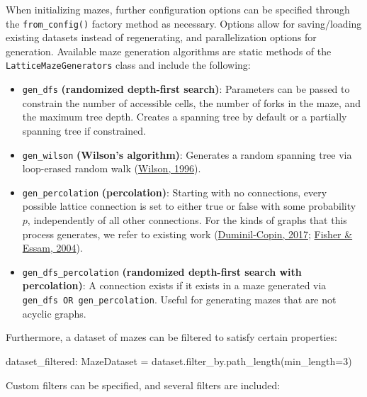 \documentclass[10pt,a4paper,onecolumn]{article}
\newenvironment{Shaded}{}{}
\newcommand{\DecValTok}[1]{\textcolor[rgb]{0.25,0.63,0.44}{#1}}
\newcommand{\NormalTok}[1]{#1}
\newcommand{\OperatorTok}[1]{\textcolor[rgb]{0.40,0.40,0.40}{#1}}
\providecommand{\tightlist}{%
  \setlength{\itemsep}{0pt}\setlength{\parskip}{0pt}}
\begin{document}
When initializing mazes, further configuration options can be specified
through the \texttt{from\_config()} factory method as necessary. Options
allow for saving/loading existing datasets instead of regenerating, and
parallelization options for generation. Available maze generation
algorithms are static methods of the \texttt{LatticeMazeGenerators}
class and include the following:

\begin{itemize}
\tightlist
\item
  \texttt{gen\_dfs} \textbf{(randomized depth-first search)}: Parameters
  can be passed to constrain the number of accessible cells, the number
  of forks in the maze, and the maximum tree depth. Creates a spanning
  tree by default or a partially spanning tree if constrained.
\item
  \texttt{gen\_wilson} \textbf{(Wilson's algorithm)}: Generates a random
  spanning tree via loop-erased random walk
  (\protect\hyperlink{ref-wilson}{Wilson, 1996}).
\item
  \texttt{gen\_percolation} \textbf{(percolation)}: Starting with no
  connections, every possible lattice connection is set to either true
  or false with some probability \(p\), independently of all other
  connections. For the kinds of graphs that this process generates, we
  refer to existing work
  (\protect\hyperlink{ref-percolation}{Duminil-Copin, 2017};
  \protect\hyperlink{ref-percolation-clustersize}{Fisher \& Essam,
  2004}).
\item
  \texttt{gen\_dfs\_percolation} \textbf{(randomized depth-first search
  with percolation)}: A connection exists if it exists in a maze
  generated via \texttt{gen\_dfs\ OR\ gen\_percolation}. Useful for
  generating mazes that are not acyclic graphs.
\end{itemize}

Furthermore, a dataset of mazes can be filtered to satisfy certain
properties:

\begin{Shaded}
\begin{Highlighting}[]
\NormalTok{dataset\_filtered: MazeDataset }\OperatorTok{=}\NormalTok{ dataset.filter\_by.path\_length(min\_length}\OperatorTok{=}\DecValTok{3}\NormalTok{)}
\end{Highlighting}
\end{Shaded}

Custom filters can be specified, and several filters are included:
\end{document}
